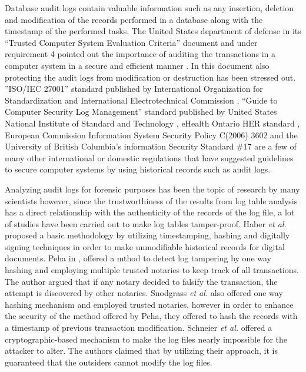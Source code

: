 Database audit logs contain valuable information such as any insertion, deletion and modification of the records performed in a database along with the timestamp of the performed tasks. The United States department of defense in its “Trusted Computer System Evaluation Criteria” document and under requirement 4 pointed out the importance of auditing the transactions in a computer system in a secure and efficient manner \cite{USDoD1985}. In this document also protecting the audit logs from modification or destruction has been stressed out. ”ISO/IEC 27001” standard published by International Organization for Standardization and International Electrotechnical Commission \cite{ISOIEC27001}, “Guide to Computer Security Log Management” standard published by United States National Institute of Standard and Technology \cite{NIST2006}, eHealth Ontario HER standard \cite{ehealth3542}, European Commission Information System Security Policy C(2006) 3602 \cite{EC2006} and the University of British Columbia's information Security Standard {\#}17 \cite{UBC2014} are a few of many other international or domestic regulations that have suggested guidelines to secure computer systems by using historical records such as audit logs.

Analyzing audit logs for forensic purposes has been the topic of research by many scientists however, since the trustworthiness of the results from log table analysis has a direct relationship with the authenticity of the records of the log file, a lot of studies have been carried out to make log tables tamper-proof. Haber {\it et al.}\cite{haber1991how} proposed a basic methodology by utilizing timestamping, hashing and digitally signing techniques in order to make unmodifiable historical records for digital documents. Peha in \cite{peha1999electronic}, offered a mthod to detect log tampering by one way hashing and employing multiple trusted notaries to keep track of all transactions. The author argued that if any notary decided to falsify the transaction, the attempt is discovered by other notaries. Snodgrass {\it et al.} \cite{snodgrass2004Tamper} also offered one way hashing mechanism and employed trusted notaries, however in order to enhance the security of the method offered by Peha, they offered to hash the records with a timestamp of previous transaction modification. Schneier {\it et al.}\cite{schneier1998cryptoraphic} offered a cryptographic-based mechanism to make the log files nearly impossible for the attacker to alter. The authors claimed that by utilizing their approach, it is guaranteed that the outsiders cannot modify the log files.

